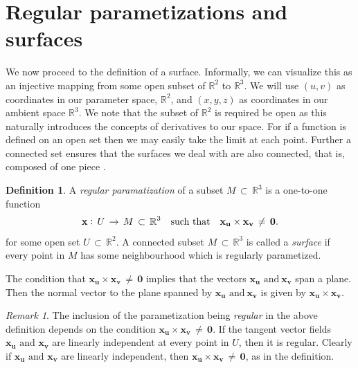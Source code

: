 \documentclass{UKZNcomp}
\newcommand{\vect}[1]{\mathbf{#1}} %
\theoremstyle{definition}
\newtheorem{definition}{Definition}[section]
\theoremstyle{remark}
\newtheorem*{remark}{Remark}
\begin{document}
\section{Regular parametizations and surfaces}
We now proceed to the definition of a surface. Informally, we can visualize this as an injective mapping from some open subset of $\mathbb{R}^{2}$ to $\mathbb{R}^{3}$. We will use $(u , v)$ as coordinates in our parameter space, $\mathbb{R}^{2}$, and $(x , y, z) $ as coordinates in our ambient space $\mathbb{R}^{3}$. We note that the subset of $\mathbb{R}^{2}$ is required be open as this naturally introduces the concepts of derivatives to our space. For if a function is defined on an open set then we may easily take the limit at each point. Further a connected set ensures that the surfaces we deal with are also connected, that is, composed of one piece \cite{DC1976}. 

\begin{definition}{}
A \textit{regular paramatization} of a subset $M \, \subset \, \mathbb{R}^{3}$ is a one-to-one function
\begin{align*}
\vect{x} \vcentcolon \, U \, \to \, M \, \subset \, \mathbb{R}^{3} \quad \text{such that} \quad \vect{x_{\bm{u}}} \times \vect{x_{\bm{v}}} \, \neq \, \vect{0}.
\end{align*}
for some open set $U \, \subset \, \mathbb{R}^{2}$. A connected subset $M \, \subset \, \mathbb{R}^{3}$ is called a \textit{surface} if every point in $M$ has some neighbourhood which is regularly parametized. 
\end{definition}

The condition that $\vect{x_{\bm{u}}} \times \vect{x_{\bm{v}}} \, \neq \, \vect{0}$ implies that the vectors $\vect{x_{\bm{u}}} \,\, \text{and} \ \vect{x_{\bm{v}}}$ span a plane. Then the normal vector to the plane spanned by $\vect{x_{\bm{u}}} \,\, \text{and} \ \vect{x_{\bm{v}}}$ is given by $ \vect{x_{\bm{u}}} \times \vect{x_{\bm{v}}}$.

\begin{remark}
The inclusion of the parametization being \textit{regular} in the above definition depends on the condition $\vect{x_{\bm{u}}} \times \vect{x_{\bm{v}}} \, \neq \, \vect{0}$. If the tangent vector fields $\vect{x_{\bm{u}}} \,\,\text{and}\, \,\vect{x_{\bm{v}}}$ are linearly independent at every point in $U$, then it is regular. Clearly if $\vect{x_{\bm{u}}} \,\,\text{and} \,\,\vect{x_{\bm{v}}}$ are linearly independent, then $\vect{x_{\bm{u}}} \times \vect{x_{\bm{v}}} \, \neq \, \vect{0}$, as in the definition.
\end{remark}
\end{document}
